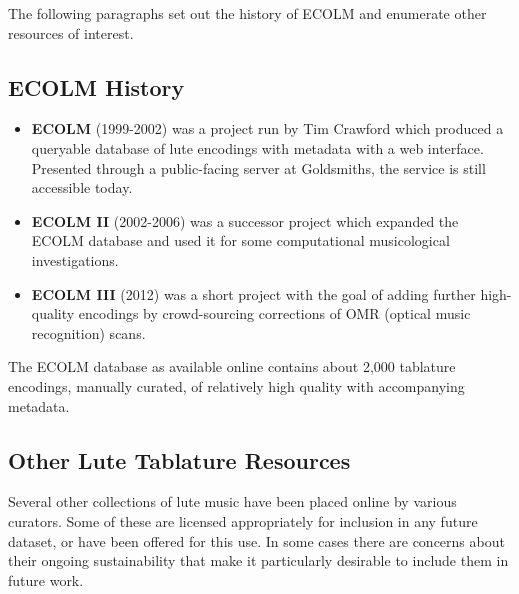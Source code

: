 \documentclass[9pt,twocolumn]{extarticle}
\begin{document}
\begin{sloppypar}
  The following paragraphs set out the history of ECOLM and enumerate
  other resources of interest.

  \subsection{ECOLM History}

  \begin{itemize}
  \item {\bf ECOLM} (1999-2002) was a project run by Tim Crawford
    which produced a queryable database of lute encodings with
    metadata with a web interface. Presented through a public-facing
    server at Goldsmiths, the service is still accessible today.
  \item {\bf ECOLM II} (2002-2006) was a successor project which
    expanded the ECOLM database and used it for some computational
    musicological investigations.
  \item {\bf ECOLM III} (2012) was a short project with the goal of
    adding further high-quality encodings by crowd-sourcing
    corrections of OMR (optical music recognition) scans.
  \end{itemize}

  The ECOLM database as available online contains about 2,000
  tablature encodings, manually curated, of relatively high quality
  with accompanying metadata.

  \subsection{Other Lute Tablature Resources}

  Several other collections of lute music have been placed online by
  various curators. Some of these are licensed appropriately for
  inclusion in any future dataset, or have been offered for this use.
  In some cases there are concerns about their ongoing sustainability
  that make it particularly desirable to include them in future work.


\end{sloppypar}
\end{document}
